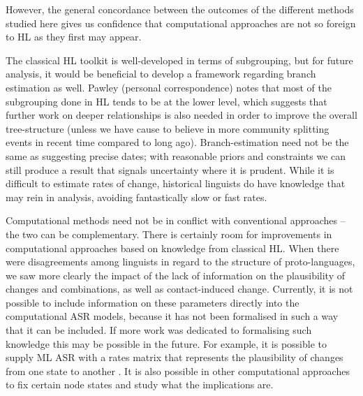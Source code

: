 \documentclass[12pt,letterpaper]{article}
\begin{document}
However, the general concordance between the outcomes of the different methods studied here gives us confidence that computational approaches are not so foreign to HL as they first may appear. 

The classical HL toolkit is well-developed in terms of subgrouping, but for future analysis, it would be beneficial to develop a framework regarding branch estimation as well. Pawley (personal correspondence) notes that most of the subgrouping done in HL tends to be at the lower level, which suggests that further work on deeper relationships is also needed in order to improve the overall tree-structure (unless we have cause to believe in more community splitting events in recent time compared to long ago). Branch-estimation need not be the same as suggesting precise dates; with reasonable priors and constraints we can still produce a result that signals uncertainty where it is prudent. While it is difficult to estimate rates of change, historical linguists do have knowledge that may rein in analysis, avoiding fantastically slow or fast rates.

Computational methods need not be in conflict with conventional approaches -- the two can be complementary. There is certainly room for improvements in computational approaches based on knowledge from classical HL. When there were disagreements among linguists in regard to the structure of proto-languages, we saw more clearly the impact of the lack of information on the plausibility of changes and combinations, as well as contact-induced change. Currently, it is not possible to include information on these parameters directly into the computational ASR models, because it has not been formalised in such a way that it can be included. If more work was dedicated to formalising such knowledge this may be possible in the future. For example, it is possible to supply ML ASR with a rates matrix that represents the plausibility of changes from one state to another \citep[8--9]{R-corHMM}. It is also possible in other computational approaches to fix certain node states and study what the implications are.


\end{document}
